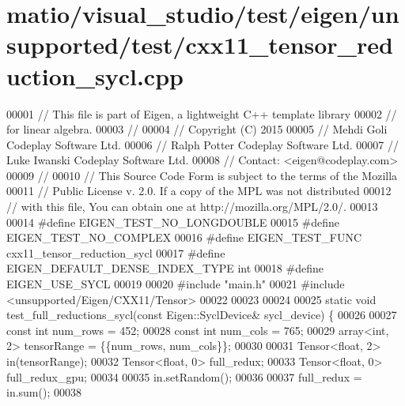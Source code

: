 \hypertarget{matio_2visual__studio_2test_2eigen_2unsupported_2test_2cxx11__tensor__reduction__sycl_8cpp_source}{}\section{matio/visual\+\_\+studio/test/eigen/unsupported/test/cxx11\+\_\+tensor\+\_\+reduction\+\_\+sycl.cpp}
\label{matio_2visual__studio_2test_2eigen_2unsupported_2test_2cxx11__tensor__reduction__sycl_8cpp_source}

\begin{DoxyCode}
00001 \textcolor{comment}{// This file is part of Eigen, a lightweight C++ template library}
00002 \textcolor{comment}{// for linear algebra.}
00003 \textcolor{comment}{//}
00004 \textcolor{comment}{// Copyright (C) 2015}
00005 \textcolor{comment}{// Mehdi Goli    Codeplay Software Ltd.}
00006 \textcolor{comment}{// Ralph Potter  Codeplay Software Ltd.}
00007 \textcolor{comment}{// Luke Iwanski  Codeplay Software Ltd.}
00008 \textcolor{comment}{// Contact: <eigen@codeplay.com>}
00009 \textcolor{comment}{//}
00010 \textcolor{comment}{// This Source Code Form is subject to the terms of the Mozilla}
00011 \textcolor{comment}{// Public License v. 2.0. If a copy of the MPL was not distributed}
00012 \textcolor{comment}{// with this file, You can obtain one at http://mozilla.org/MPL/2.0/.}
00013 
00014 \textcolor{preprocessor}{#define EIGEN\_TEST\_NO\_LONGDOUBLE}
00015 \textcolor{preprocessor}{#define EIGEN\_TEST\_NO\_COMPLEX}
00016 \textcolor{preprocessor}{#define EIGEN\_TEST\_FUNC cxx11\_tensor\_reduction\_sycl}
00017 \textcolor{preprocessor}{#define EIGEN\_DEFAULT\_DENSE\_INDEX\_TYPE int}
00018 \textcolor{preprocessor}{#define EIGEN\_USE\_SYCL}
00019 
00020 \textcolor{preprocessor}{#include "main.h"}
00021 \textcolor{preprocessor}{#include <unsupported/Eigen/CXX11/Tensor>}
00022 
00023 
00024 
00025 \textcolor{keyword}{static} \textcolor{keywordtype}{void} test\_full\_reductions\_sycl(\textcolor{keyword}{const} Eigen::SyclDevice&  sycl\_device) \{
00026 
00027   \textcolor{keyword}{const} \textcolor{keywordtype}{int} num\_rows = 452;
00028   \textcolor{keyword}{const} \textcolor{keywordtype}{int} num\_cols = 765;
00029   array<int, 2> tensorRange = \{\{num\_rows, num\_cols\}\};
00030 
00031   Tensor<float, 2> in(tensorRange);
00032   Tensor<float, 0> full\_redux;
00033   Tensor<float, 0> full\_redux\_gpu;
00034 
00035   in.setRandom();
00036 
00037   full\_redux = in.sum();
00038 

\end{DoxyCode}
